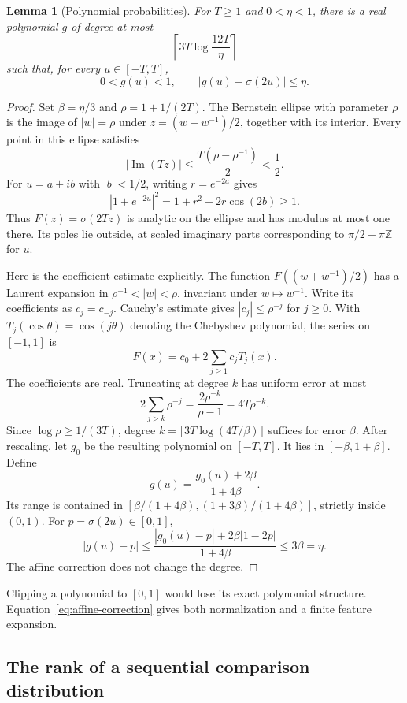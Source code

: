 \documentclass[11pt]{article}
\newtheorem{lemma}[theorem]{Lemma}
\theoremstyle{definition}
\theoremstyle{remark}
\begin{document}
\begin{lemma}[Polynomial probabilities]\label{lem:poly-sigmoid}
For $T\ge1$ and $0<\eta<1$, there is a real polynomial $g$ of degree at most
\[
\left\lceil3T\log\frac{12T}{\eta}\right\rceil
\]
such that, for every $u\in[-T,T]$,
\[
0<g(u)<1,
\qquad |g(u)-\sigma(2u)|\le\eta.
\]
\end{lemma}
\begin{proof}
Set $\beta=\eta/3$ and $\rho=1+1/(2T)$. The Bernstein ellipse with parameter $\rho$ is the image of $|w|=\rho$ under $z=(w+w^{-1})/2$, together with its interior. Every point in this ellipse satisfies
\[
|\operatorname{Im}(Tz)|\le\frac{T(\rho-\rho^{-1})}{2}<\frac12.
\]
For $u=a+ib$ with $|b|<1/2$, writing $r=e^{-2a}$ gives
\[
|1+e^{-2u}|^2=1+r^2+2r\cos(2b)\ge1.
\]
Thus $F(z)=\sigma(2Tz)$ is analytic on the ellipse and has modulus at most one there. Its poles lie outside, at scaled imaginary parts corresponding to $\pi/2+\pi\mathbb Z$ for $u$.

Here is the coefficient estimate explicitly. The function $F((w+w^{-1})/2)$ has a Laurent expansion in $\rho^{-1}<|w|<\rho$, invariant under $w\mapsto w^{-1}$. Write its coefficients as $c_j=c_{-j}$. Cauchy's estimate gives $|c_j|\le\rho^{-j}$ for $j\ge0$. With $T_j(\cos\theta)=\cos(j\theta)$ denoting the Chebyshev polynomial, the series on $[-1,1]$ is
\[
F(x)=c_0+2\sum_{j\ge1}c_jT_j(x).
\]
The coefficients are real. Truncating at degree $k$ has uniform error at most
\[
2\sum_{j>k}\rho^{-j}
=\frac{2\rho^{-k}}{\rho-1}
=4T\rho^{-k}.
\]
Since $\log\rho\ge1/(3T)$, degree $k=\lceil3T\log(4T/\beta)\rceil$ suffices for error $\beta$. After rescaling, let $g_0$ be the resulting polynomial on $[-T,T]$. It lies in $[-\beta,1+\beta]$. Define
\begin{equation}\label{eq:affine-correction}
g(u)=\frac{g_0(u)+2\beta}{1+4\beta}.
\end{equation}
Its range is contained in $[\beta/(1+4\beta),(1+3\beta)/(1+4\beta)]$, strictly inside $(0,1)$. For $p=\sigma(2u)\in[0,1]$,
\[
|g(u)-p|
\le\frac{|g_0(u)-p|+2\beta|1-2p|}{1+4\beta}
\le3\beta=\eta.
\]
The affine correction does not change the degree.
\end{proof}

Clipping a polynomial to $[0,1]$ would lose its exact polynomial structure. Equation~\eqref{eq:affine-correction} gives both normalization and a finite feature expansion.

\subsection{The rank of a sequential comparison distribution}
\end{document}
